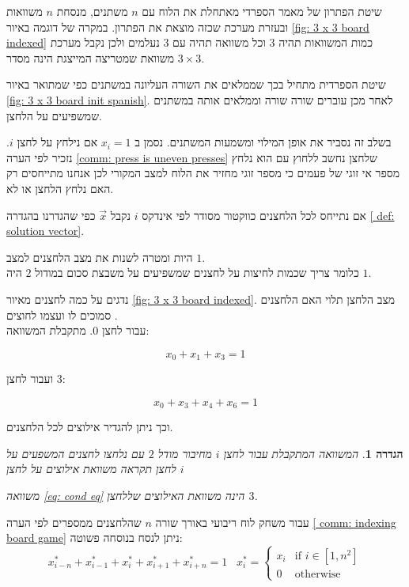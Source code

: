 \documentclass[12pt,twoside]{article}
\newtheorem{definition}{הגדרה}[section]
\begin{document}
שיטת הפתרון של מאמר הספרדי מאתחלת את הלוח עם  
$n$
משתנים,
מנסחת 
$n$
משוואות
ובעזרת מערכת שכזה מוצאת את הפתרון.
במקרה של דוגמה 
באיור 
\ref{fig: 3 x 3 board indexed}
כמות המשוואות תהיה
$3$
וכל משוואה תהיה עם 
$3$
נעלמים
ולכן נקבל מערכת משוואת שמטריצה המייצגת הינה מסדר 
$3 \times 3$.

שיטת הספרדית מתחיל בכך
שממלאים את השורה העליונה במשתנים
כפי שמתואר באיור 
\ref{fig: 3 x 3 board init spanish}.
לאחר מכן עוברים שורה שורה 
וממלאים אותה במשתנים שמשפיעים על הלחצן.

בשלב זה נסביר את אופן המילוי ומשמעות המשתנים.
נסמן ב
$x_i = 1$
אם נילחץ על לחצן 
$i$.
נזכיר לפי הערה 
\ref{comm: press is uneven presses}
שלחצן נחשב ללחוץ עם הוא נלחץ מספר אי זוגי של פעמים 
כי מספר זוגי מחזיר את הלוח למצב המקורי לכן
אנחנו מתייחסים רק האם נלחץ הלחצן או לא.

אם נתייחס לכל הלחצנים כווקטור מסודר לפי אינדקס
$i$
נקבל 
$\vec{x}$
כפי שהגדרנו בהגדרה 
\ref{ def: solution vector}.

היות ומטרה לשנות את מצב הלחצנים
למצב 
$1$.
\\
כלומר צריך שכמות לחיצות על לחצנים שמשפיעים על 
משבצת סכום במודול
$2$
היה 
$1$.

נדגים
על כמה לחצנים מאיור  
\ref{fig: 3 x 3 board indexed}.
מצב הלחצן תלוי האם הלחצנים 
סמוכים לו  ועצמו לחוצים .
\\
עבור 
לחצן 
$0$.
מתקבלת המשוואה:

\[ x_0 + x_1 + x_3 = 1\]

ועבור לחצן 
$3$:

\begin{equation}
    \label{eq: cond eq}
    x_0 + x_3 + x_4 + x_6 = 1
\end{equation}


וכך ניתן להגדיר אילוצים לכל הלחצנים.

\begin{definition}
    \label{ def: depndeciy equation}
    המשוואה המתקבלת
    עבור לחצן 
    $i$
    מחיבור מודל 
    $2$
    עם נלחצו לחצנים המשפעים על לחצן 
    תקראה
    משוואת אילוצים על לחצן 
    $i$
    
    משוואה 
    \ref{eq: cond eq}
    הינה משוואת האילוצים שללחצן
    $3$.
\end{definition}

עבור משחק לוח
ריבועי באורך שורה 
$n$
שהלחצנים ממספרים לפי הערה
\ref{ comm: indexing board game}
ניתן לנסח בנוסחה פשוטה:
\begin{equation}
    \label{eq: depndeciy equation}
    x^*_{i - n} + x^*_{i - 1} + x^*_{i} + x^*_{i + 1} + x^*_{i + n} = 1
    \hspace{10pt}
    x^*_i =
    \begin{cases}
        x_i & \text{if $i \in [1,n^2]$} \\
        0 & \text{otherwise}
    \end{cases}
\end{equation}
\end{document}
